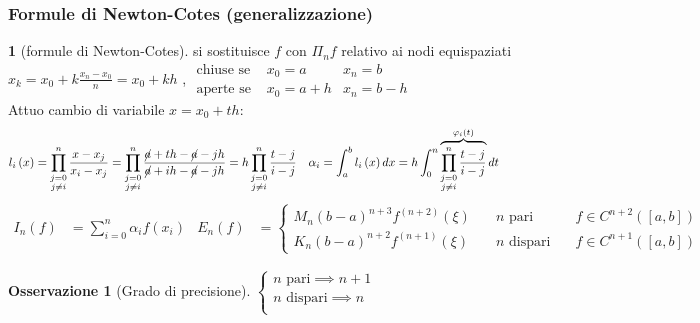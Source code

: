 \documentclass[a4paper,10pt]{article}
\theoremstyle{definition}
\theoremstyle{indentdefinition}
\theoremstyle{indenttheorem}
\theoremstyle{myremark}
\newtheorem*{rem*}{Osservazione}
\theoremstyle{indentgeneral}
\newtheorem{lyxalgorithm}[thm]{\protect\algorithmname}
\theoremstyle{plain}
\theoremstyle{plain}
\begin{document}
\subsubsection{Formule di Newton-Cotes (generalizzazione)}
\begin{lyxalgorithm}[formule di Newton-Cotes]
\label{alg:formule-newton-cotes} si sostituisce $f$ con $\Pi_nf$ relativo ai nodi equispaziati $x_{k}=x_{0}+k\frac{x_{n}-x_{0}}{n}=x_0+kh$
, $\begin{array}{lll}
\text{chiuse se } & x_{0}=a & x_{n}=b\\
\text{aperte se } & x_{0}=a+h & x_{n}=b-h
\end{array}$ \\
Attuo cambio di variabile $x=x_0+th$:
\begin{align*}
l_{i}\left(x\right) & =\prod_{\substack{j=0\\
j\neq i
}
}^{n}\frac{x-x_{j}}{x_{i}-x_{j}}=\prod_{\substack{j=0\\
j\neq i
}
}^{n}\frac{\cancel{a}+th-\cancel{a}-jh}{\cancel{a}+ih-\cancel{a}-jh}=h\prod_{\substack{j=0\\
j\neq i
}
}^{n}\frac{t-j}{i-j} & \alpha_{i} & =\int_{a}^{b}l_{i}\left(x\right)dx=h\int_{0}^{n}\overbrace{\prod_{\substack{j=0\\
j\neq i
}
}^{n}{\frac{t-j}{i-j}}}^{\varphi_{i}\left(t\right)}dt
\end{align*}
\begin{align*}
I_{n}\left(f\right) & =\sum_{i=0}^{n}\alpha_{i}f\left(x_{i}\right) & E_{n}\left(f\right) & =\left\{ \begin{array}{lll}
M_{n}\left(b-a\right)^{n+3}f^{\left(n+2\right)}\left(\xi\right) & \quad n\text{ pari} & \quad f\in C^{n+2}\left(\left[a,b\right]\right)\\
K_{n}\left(b-a\right)^{n+2}f^{\left(n+1\right)}\left(\xi\right) & \quad n\text{ dispari} & \quad f\in C^{n+1}\left(\left[a,b\right]\right)
\end{array}\right.
\end{align*}
\end{lyxalgorithm}

\begin{rem*}[Grado di precisione]
    $\begin{cases}
        n \text{ pari}\implies n+1\\
        n \text{ dispari}\implies n\\
    \end{cases}$
\end{rem*}
\end{document}
